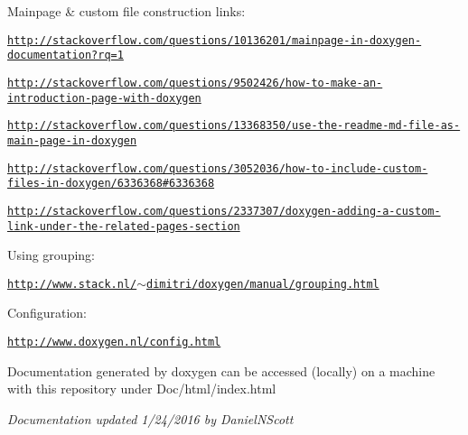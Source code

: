 Mainpage \& custom file construction links\+:
\begin{DoxyItemize}
\item \href{http://stackoverflow.com/questions/10136201/mainpage-in-doxygen-documentation?rq=1}{\tt http\+://stackoverflow.\+com/questions/10136201/mainpage-\/in-\/doxygen-\/documentation?rq=1}
\item \href{http://stackoverflow.com/questions/9502426/how-to-make-an-introduction-page-with-doxygen}{\tt http\+://stackoverflow.\+com/questions/9502426/how-\/to-\/make-\/an-\/introduction-\/page-\/with-\/doxygen}
\item \href{http://stackoverflow.com/questions/13368350/use-the-readme-md-file-as-main-page-in-doxygen}{\tt http\+://stackoverflow.\+com/questions/13368350/use-\/the-\/readme-\/md-\/file-\/as-\/main-\/page-\/in-\/doxygen}
\item \href{http://stackoverflow.com/questions/3052036/how-to-include-custom-files-in-doxygen/6336368#6336368}{\tt http\+://stackoverflow.\+com/questions/3052036/how-\/to-\/include-\/custom-\/files-\/in-\/doxygen/6336368\#6336368}
\item \href{http://stackoverflow.com/questions/2337307/doxygen-adding-a-custom-link-under-the-related-pages-section}{\tt http\+://stackoverflow.\+com/questions/2337307/doxygen-\/adding-\/a-\/custom-\/link-\/under-\/the-\/related-\/pages-\/section}
\end{DoxyItemize}

Using grouping\+:
\begin{DoxyItemize}
\item \href{http://www.stack.nl/~dimitri/doxygen/manual/grouping.html}{\tt http\+://www.\+stack.\+nl/$\sim$dimitri/doxygen/manual/grouping.\+html}
\end{DoxyItemize}

Configuration\+:
\begin{DoxyItemize}
\item \href{http://www.doxygen.nl/config.html}{\tt http\+://www.\+doxygen.\+nl/config.\+html}
\end{DoxyItemize}

Documentation generated by doxygen can be accessed (locally) on a machine with this repository under Doc/html/index.\+html

{\itshape Documentation updated 1/24/2016 by Daniel\+N\+Scott} 